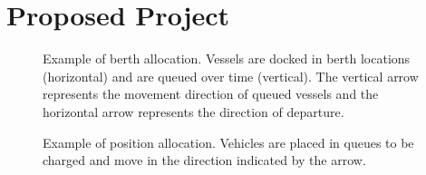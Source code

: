 \documentclass[11pt,a4paper,final]{article}
\begin{document}
\section{Proposed Project}
\label{sec:proposed-project}
\begin{subfigures}
    \begin{figure}[htpb]
    \centering
        
        \caption{Example of berth allocation. Vessels are docked in berth locations (horizontal) and are queued over
          time (vertical). The vertical arrow represents the movement direction of queued vessels and the horizontal
          arrow represents the direction of departure.}
        \label{subfig:bapexample}
    \end{figure}
    \hfill

    \begin{figure}[htpb]
    \centering
        
        \caption{Example of position allocation. Vehicles are placed in queues to be charged and move in the direction
          indicated by the arrow.}
        \label{subfig:papexample}
    \end{figure}
\end{subfigures}



\end{document}
